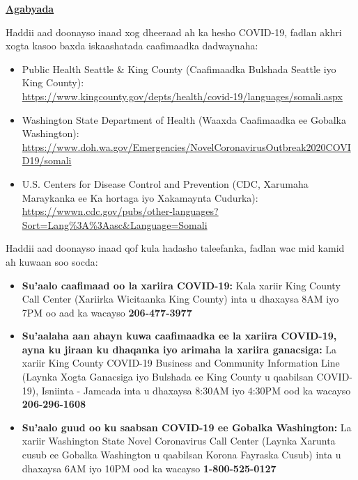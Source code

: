 \documentclass[10pt]{article}
\begin{document}
\bigskip

\large \underline{\textbf{Agabyada}}

Haddii aad doonayso inaad xog dheeraad ah ka hesho COVID-19, fadlan akhri xogta
kasoo baxda iskaashatada caafimaadka dadwaynaha:

\begin{itemize}
\item
  Public Health \textemdash Seattle \& King County (Caafimaadka Bulshada
  \textemdash Seattle iyo King County):\\
  \url{https://www.kingcounty.gov/depts/health/covid-19/languages/somali.aspx}

\item

  Washington State Department of Health (Waaxda Caafimaadka ee Gobalka Washington):\\
  \url{https://www.doh.wa.gov/Emergencies/NovelCoronavirusOutbreak2020COVID19/somali}

\item
  U.S. Centers for Disease Control and Prevention (CDC, Xarumaha Maraykanka ee
  Ka hortaga iyo Xakamaynta Cudurka):\\
  \url{https://wwwn.cdc.gov/pubs/other-languages?Sort=Lang%3A%3Aasc&Language=Somali}

\end{itemize}

Haddii aad doonayso inaad qof kula hadasho taleefanka, fadlan wac mid kamid ah
kuwaan soo socda:

\begin{itemize}

\item

  \textbf{Su'aalo caafimaad oo la xariira COVID-19:} Kala xariir King County
  Call Center (Xariirka Wicitaanka King County) inta u dhaxaysa 8AM iyo 7PM oo
  aad ka wacayso \textbf{206-477-3977}

\item

  \textbf{Su'aalaha aan ahayn kuwa caafimaadka ee la xariira COVID-19, ayna ku
  jiraan ku dhaqanka iyo arimaha la xariira ganacsiga:} La xariir King County
  COVID-19 Business and Community Information Line (Laynka Xogta Ganacsiga iyo
  Bulshada ee King County u qaabilsan COVID-19), Isniinta - Jamcada inta u
  dhaxaysa 8:30AM iyo 4:30PM ood ka wacayso \textbf{206-296-1608}

\item

  \textbf{Su'aalo guud oo ku saabsan COVID-19 ee Gobalka Washington:} La xariir
  Washington State Novel Coronavirus Call Center (Laynka Xarunta cusub ee
  Gobalka Washington u qaabilsan Korona Fayraska Cusub) inta u dhaxaysa 6AM iyo
  10PM ood ka wacayso \textbf{1-800-525-0127}

\end{itemize}
\end{document}
